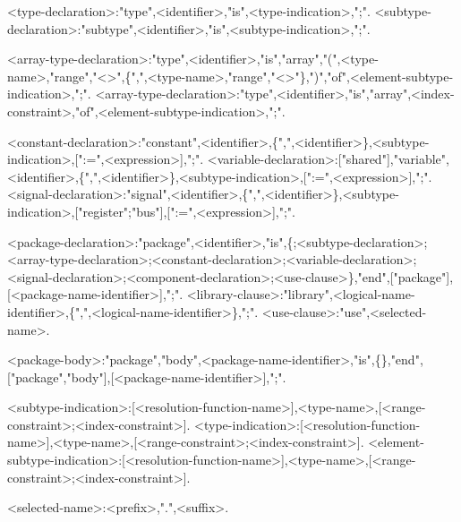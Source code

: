<type-declaration>:"type",<identifier>,"is",<type-indication>,";".
<subtype-declaration>:"subtype",<identifier>,"is",<subtype-indication>,";".

<array-type-declaration>:"type",<identifier>,"is","array","(",<type-name>,"range","\textless\textgreater",\{",",<type-name>,"range","\textless\textgreater"\},")","of",<element-subtype-indication>,";".
<array-type-declaration>:"type",<identifier>,"is","array",<index-constraint>,"of",<element-subtype-indication>,";".

<constant-declaration>:"constant",<identifier>,\{",",<identifier>\},<subtype-indication>,[":=",<expression>],";".
<variable-declaration>:["shared"],"variable",<identifier>,\{",",<identifier>\},<subtype-indication>,[":=",<expression>],";".
<signal-declaration>:"signal",<identifier>,\{",",<identifier>\},<subtype-indication>,["register";"bus"],[":=",<expression>],";".

<package-declaration>:"package",<identifier>,"is",\{<type-declaration>;<subtype-declaration>;<array-type-declaration>;<constant-declaration>;<variable-declaration>;<signal-declaration>;<component-declaration>;<use-clause>\},"end",["package"],[<package-name-identifier>],";".
<library-clause>:"library",<logical-name-identifier>,\{",",<logical-name-identifier>\},";".
<use-clause>:"use",<selected-name>.

<package-body>:"package","body",<package-name-identifier>,"is",\{\},"end",["package","body"],[<package-name-identifier>],";".

<subtype-indication>:[<resolution-function-name>],<type-name>,[<range-constraint>;<index-constraint>].
<type-indication>:[<resolution-function-name>],<type-name>,[<range-constraint>;<index-constraint>].
<element-subtype-indication>:[<resolution-function-name>],<type-name>,[<range-constraint>;<index-constraint>].

<selected-name>:<prefix>,".",<suffix>.
